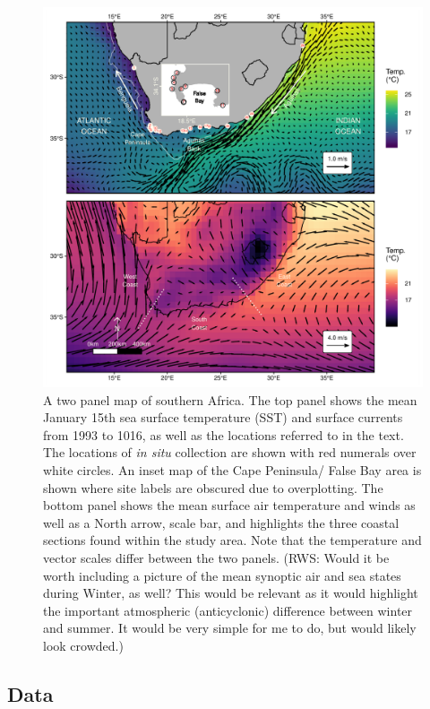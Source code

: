 \documentclass[a4paper,10pt,review]{elsarticle}
\begin{document}
\begin{figure}
\includegraphics[width=1.0\textwidth]{figure_1.pdf}
\caption{A two panel map of southern Africa. The top panel shows the mean January 15th sea surface temperature (SST) and surface currents from 1993 to 1016, as well as the locations referred to in the text. The locations of \emph{in situ} collection are shown with red numerals over white circles. An inset map of the Cape Peninsula/ False Bay area is shown where site labels are obscured due to overplotting. The bottom panel shows the mean surface air temperature and winds as well as a North arrow, scale bar, and highlights the three coastal sections found within the study area. Note that the temperature and vector scales differ between the two panels. (RWS: Would it be worth including a picture of the mean synoptic air and sea states during Winter, as well? This would be relevant as it would highlight the important atmospheric (anticyclonic) difference between winter and summer. It would be very simple for me to do, but would likely look crowded.)}
\label{figure1}
\end{figure}

\subsection{Data}
\end{document}
